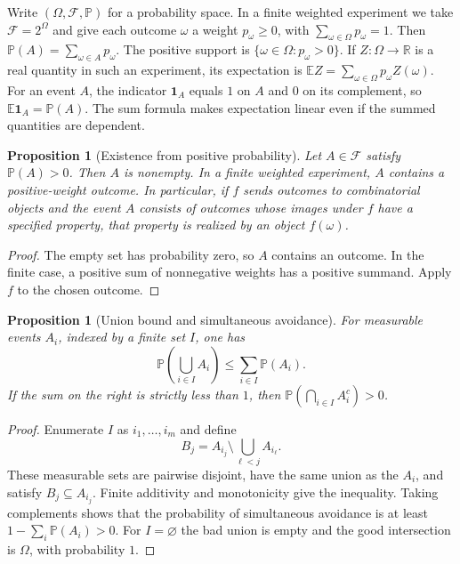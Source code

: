 \documentclass[11pt,oneside,openany]{book}
\theoremstyle{plain}
\newtheorem{proposition}[theorem]{Proposition}
\theoremstyle{definition}
\theoremstyle{remark}
\begin{document}
Write \((\Omega,\mathcal F,\mathbb P)\) for a probability space. In a finite
weighted experiment we take \(\mathcal F=2^\Omega\) and give each outcome
\(\omega\) a weight \(p_\omega\ge 0\), with
\(\sum_{\omega\in\Omega}p_\omega=1\).
Then \(\mathbb P(A)=\sum_{\omega\in A}p_\omega\). The positive support is
\(\{\omega\in\Omega:p_\omega>0\}\). If \(Z:\Omega\to\mathbb R\) is a real
quantity in such an experiment, its expectation is
\(\mathbb E Z=\sum_{\omega\in\Omega}p_\omega Z(\omega)\).
For an event \(A\), the indicator \(\mathbf 1_A\) equals \(1\) on \(A\) and
\(0\) on its complement, so \(\mathbb E\mathbf 1_A=\mathbb P(A)\). The sum
formula makes expectation linear even if the summed quantities are
dependent.

\begin{proposition}[Existence from positive probability]
\label{p205:W14}
Let \(A\in\mathcal F\) satisfy \(\mathbb P(A)>0\). Then \(A\) is nonempty.
In a finite weighted experiment, \(A\) contains a positive-weight
outcome. In particular, if \(f\) sends outcomes to combinatorial objects
and the event \(A\) consists of outcomes whose images under \(f\) have a
specified property, that property is realized by an object \(f(\omega)\).
\end{proposition}

\begin{proof}
The empty set has probability zero, so \(A\) contains an outcome.
In the finite case, a positive sum of nonnegative weights has a positive
summand. Apply \(f\) to the chosen outcome.
\end{proof}

\begin{proposition}[Union bound and simultaneous avoidance]
\label{p205:W15}
For measurable events \(A_i\), indexed by a finite set \(I\), one has
\[
  \mathbb P\!\left(\bigcup_{i\in I} A_i\right)
       \le \sum_{i\in I}\mathbb P(A_i).
\]
If the sum on the right is strictly less than \(1\), then
\(\mathbb P(\bigcap_{i\in I} A_i^c)>0\).
\end{proposition}

\begin{proof}
Enumerate \(I\) as \(i_1,\ldots,i_m\) and define
\[
 B_j=A_{i_j}\setminus\bigcup_{\ell<j}A_{i_\ell}.
\]
These measurable sets are pairwise disjoint, have the same union as the
\(A_i\), and satisfy \(B_j\subseteq A_{i_j}\).
Finite additivity and monotonicity give
the inequality. Taking complements shows that the probability of
simultaneous avoidance is at least \(1-\sum_i\mathbb P(A_i)>0\).
For \(I=\varnothing\) the bad union is empty and the good intersection
is \(\Omega\), with probability \(1\).
\end{proof}
\end{document}
